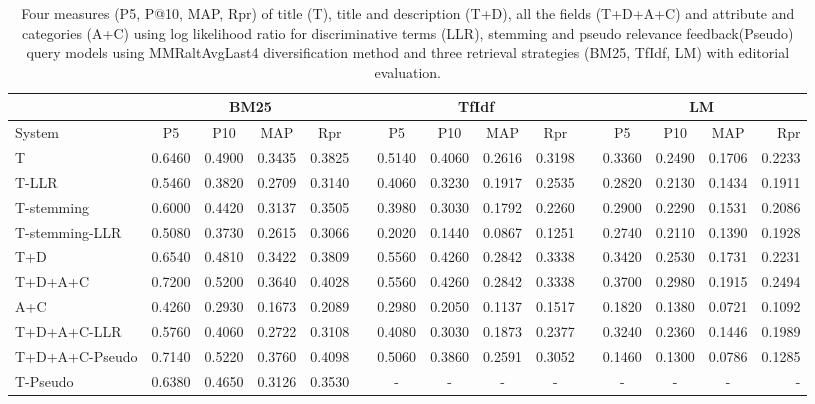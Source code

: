 \begin{table}[H]
\begin{center}
\scriptsize
\caption{
Four measures (P\@5, P@10, MAP, Rpr) of title (T), title and description (T+D), all the fields (T+D+A+C) and attribute and categories (A+C) using log likelihood ratio for discriminative terms (LLR), stemming and pseudo relevance feedback(Pseudo) query models using MMRaltAvgLast4 diversification method and three retrieval strategies (BM25, TfIdf, LM) with editorial evaluation.}
\label{table:mmrAltAvgLast4Ed}

\begin{tabular}{lcccccccccccccr}
\toprule
 & \multicolumn{4}{c}{BM25} &    & \multicolumn{4}{c}{TfIdf} &    & \multicolumn{4}{c}{LM} \\
\midrule
System & P\@5 & P\@10 & MAP & Rpr &   & P\@5 & P\@10 & MAP & Rpr &   & P\@5 & P\@10 & MAP & Rpr \\
\midrule
T & 0.6460 & 0.4900 & 0.3435 & 0.3825 &   & 0.5140 & 0.4060 & 0.2616 & 0.3198 &   & 0.3360 & 0.2490 & 0.1706 & 0.2233 \\
T-LLR & 0.5460 & 0.3820 & 0.2709 & 0.3140 &   & 0.4060 & 0.3230 & 0.1917 & 0.2535 &   & 0.2820 & 0.2130 & 0.1434 & 0.1911 \\
T-stemming & 0.6000 & 0.4420 & 0.3137 & 0.3505 &   & 0.3980 & 0.3030 & 0.1792 & 0.2260 &   & 0.2900 & 0.2290 & 0.1531 & 0.2086 \\
T-stemming-LLR & 0.5080 & 0.3730 & 0.2615 & 0.3066 &   & 0.2020 & 0.1440 & 0.0867 & 0.1251 &   & 0.2740 & 0.2110 & 0.1390 & 0.1928 \\
T+D & 0.6540 & 0.4810 & 0.3422 & 0.3809 &   & 0.5560 & 0.4260 & 0.2842 & 0.3338 &   & 0.3420 & 0.2530 & 0.1731 & 0.2231 \\
T+D+A+C & 0.7200 & 0.5200 & 0.3640 & 0.4028 &   & 0.5560 & 0.4260 & 0.2842 & 0.3338 &   & 0.3700 & 0.2980 & 0.1915 & 0.2494 \\
A+C & 0.4260 & 0.2930 & 0.1673 & 0.2089 &   & 0.2980 & 0.2050 & 0.1137 & 0.1517 &   & 0.1820 & 0.1380 & 0.0721 & 0.1092 \\
T+D+A+C-LLR & 0.5760 & 0.4060 & 0.2722 & 0.3108 &   & 0.4080 & 0.3030 & 0.1873 & 0.2377 &   & 0.3240 & 0.2360 & 0.1446 & 0.1989 \\
T+D+A+C-Pseudo & 0.7140 & 0.5220 & 0.3760 & 0.4098 &   & 0.5060 & 0.3860 & 0.2591 & 0.3052 &   & 0.1460 & 0.1300 & 0.0786 & 0.1285 \\
T-Pseudo & 0.6380 & 0.4650 & 0.3126 & 0.3530 &   & - & - & - & - &   & - & - & - & -  \\
\bottomrule
\end{tabular}
\end{center}
\end{table}


